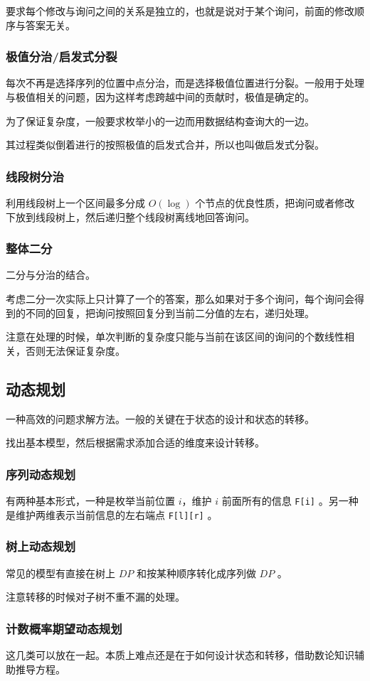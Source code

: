 \documentclass[UTF-8]{ctexart}
\begin{document}
			要求每个修改与询问之间的关系是独立的，也就是说对于某个询问，前面的修改顺序与答案无关。
			\subsubsection{极值分治/启发式分裂}
			每次不再是选择序列的位置中点分治，而是选择极值位置进行分裂。一般用于处理与极值相关的问题，因为这样考虑跨越中间的贡献时，极值是确定的。
	
			为了保证复杂度，一般要求枚举小的一边而用数据结构查询大的一边。
	
			其过程类似倒着进行的按照极值的启发式合并，所以也叫做启发式分裂。
			\subsubsection{线段树分治}
			利用线段树上一个区间最多分成 $O(\log)$ 个节点的优良性质，把询问或者修改下放到线段树上，然后递归整个线段树离线地回答询问。
			\subsubsection{整体二分}
			二分与分治的结合。
	
			考虑二分一次实际上只计算了一个的答案，那么如果对于多个询问，每个询问会得到的不同的回复，把询问按照回复分到当前二分值的左右，递归处理。
	
			注意在处理的时候，单次判断的复杂度只能与当前在该区间的询问的个数线性相关，否则无法保证复杂度。
		\subsection{动态规划}
		一种高效的问题求解方法。一般的关键在于状态的设计和状态的转移。
	
		找出基本模型，然后根据需求添加合适的维度来设计转移。
			\subsubsection{序列动态规划}
			有两种基本形式，一种是枚举当前位置 $i$，维护 $i$ 前面所有的信息 \texttt{F[i]} 。另一种是维护两维表示当前信息的左右端点 \texttt{F[l][r]}  。
			\subsubsection{树上动态规划}
			常见的模型有直接在树上 $DP$ 和按某种顺序转化成序列做 $DP$ 。
	
			注意转移的时候对子树不重不漏的处理。
			\subsubsection{计数概率期望动态规划}
			这几类可以放在一起。本质上难点还是在于如何设计状态和转移，借助数论知识辅助推导方程。
	
\end{document}
